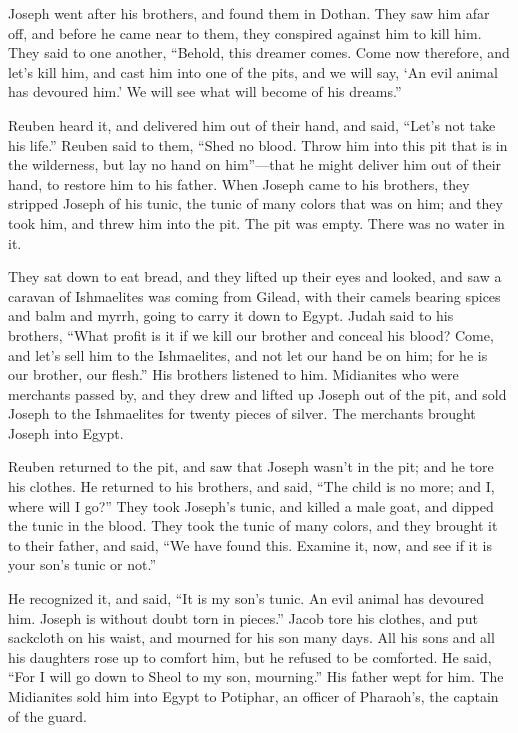 {\par }{\PP Joseph went after his brothers, and found them in Dothan.
They saw him afar off, and before he came near to them, they conspired against him to kill him.
They said to one another, “Behold, this dreamer comes.
Come now therefore, and let’s kill him, and cast him into one of the pits, and we will say, ‘An evil animal has devoured him.’ We will see what will become of his dreams.”
\par }{\PP {}Reuben heard it, and delivered him out of their hand, and said, “Let’s not take his life.”
Reuben said to them, “Shed no blood. Throw him into this pit that is in the wilderness, but lay no hand on him”—that he might deliver him out of their hand, to restore him to his father.
When Joseph came to his brothers, they stripped Joseph of his tunic, the tunic of many colors that was on him;
and they took him, and threw him into the pit. The pit was empty. There was no water in it.
\par }{\PP {}They sat down to eat bread, and they lifted up their eyes and looked, and saw a caravan of Ishmaelites was coming from Gilead, with their camels bearing spices and balm and myrrh, going to carry it down to Egypt.
Judah said to his brothers, “What profit is it if we kill our brother and conceal his blood?
Come, and let’s sell him to the Ishmaelites, and not let our hand be on him; for he is our brother, our flesh.” His brothers listened to him.
Midianites who were merchants passed by, and they drew and lifted up Joseph out of the pit, and sold Joseph to the Ishmaelites for twenty pieces of silver. The merchants brought Joseph into Egypt.
\par }{\PP {}Reuben returned to the pit, and saw that Joseph wasn’t in the pit; and he tore his clothes.
He returned to his brothers, and said, “The child is no more; and I, where will I go?”
They took Joseph’s tunic, and killed a male goat, and dipped the tunic in the blood.
They took the tunic of many colors, and they brought it to their father, and said, “We have found this. Examine it, now, and see if it is your son’s tunic or not.”
\par }{\PP {}He recognized it, and said, “It is my son’s tunic. An evil animal has devoured him. Joseph is without doubt torn in pieces.”
Jacob tore his clothes, and put sackcloth on his waist, and mourned for his son many days.
All his sons and all his daughters rose up to comfort him, but he refused to be comforted. He said, “For I will go down to Sheol to my son, mourning.” His father wept for him.
The Midianites sold him into Egypt to Potiphar, an officer of Pharaoh’s, the captain of the guard.

}
